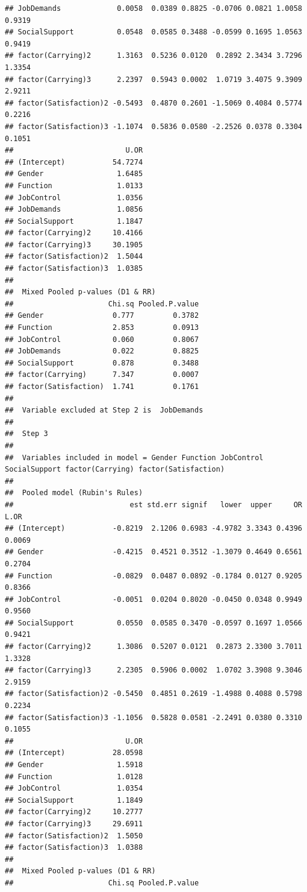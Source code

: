 \documentclass[]{book}
\begin{document}
\begin{verbatim}
## JobDemands             0.0058  0.0389 0.8825 -0.0706 0.0821 1.0058 0.9319
## SocialSupport          0.0548  0.0585 0.3488 -0.0599 0.1695 1.0563 0.9419
## factor(Carrying)2      1.3163  0.5236 0.0120  0.2892 2.3434 3.7296 1.3354
## factor(Carrying)3      2.2397  0.5943 0.0002  1.0719 3.4075 9.3909 2.9211
## factor(Satisfaction)2 -0.5493  0.4870 0.2601 -1.5069 0.4084 0.5774 0.2216
## factor(Satisfaction)3 -1.1074  0.5836 0.0580 -2.2526 0.0378 0.3304 0.1051
##                          U.OR
## (Intercept)           54.7274
## Gender                 1.6485
## Function               1.0133
## JobControl             1.0356
## JobDemands             1.0856
## SocialSupport          1.1847
## factor(Carrying)2     10.4166
## factor(Carrying)3     30.1905
## factor(Satisfaction)2  1.5044
## factor(Satisfaction)3  1.0385
## 
##  Mixed Pooled p-values (D1 & RR) 
##                      Chi.sq Pooled.P.value
## Gender                0.777         0.3782
## Function              2.853         0.0913
## JobControl            0.060         0.8067
## JobDemands            0.022         0.8825
## SocialSupport         0.878         0.3488
## factor(Carrying)      7.347         0.0007
## factor(Satisfaction)  1.741         0.1761
## 
##  Variable excluded at Step 2 is  JobDemands 
## 
##  Step 3 
## 
##  Variables included in model = Gender Function JobControl SocialSupport factor(Carrying) factor(Satisfaction) 
## 
##  Pooled model (Rubin's Rules) 
##                           est std.err signif   lower  upper     OR   L.OR
## (Intercept)           -0.8219  2.1206 0.6983 -4.9782 3.3343 0.4396 0.0069
## Gender                -0.4215  0.4521 0.3512 -1.3079 0.4649 0.6561 0.2704
## Function              -0.0829  0.0487 0.0892 -0.1784 0.0127 0.9205 0.8366
## JobControl            -0.0051  0.0204 0.8020 -0.0450 0.0348 0.9949 0.9560
## SocialSupport          0.0550  0.0585 0.3470 -0.0597 0.1697 1.0566 0.9421
## factor(Carrying)2      1.3086  0.5207 0.0121  0.2873 2.3300 3.7011 1.3328
## factor(Carrying)3      2.2305  0.5906 0.0002  1.0702 3.3908 9.3046 2.9159
## factor(Satisfaction)2 -0.5450  0.4851 0.2619 -1.4988 0.4088 0.5798 0.2234
## factor(Satisfaction)3 -1.1056  0.5828 0.0581 -2.2491 0.0380 0.3310 0.1055
##                          U.OR
## (Intercept)           28.0598
## Gender                 1.5918
## Function               1.0128
## JobControl             1.0354
## SocialSupport          1.1849
## factor(Carrying)2     10.2777
## factor(Carrying)3     29.6911
## factor(Satisfaction)2  1.5050
## factor(Satisfaction)3  1.0388
## 
##  Mixed Pooled p-values (D1 & RR) 
##                      Chi.sq Pooled.P.value

\end{verbatim}
\end{document}
